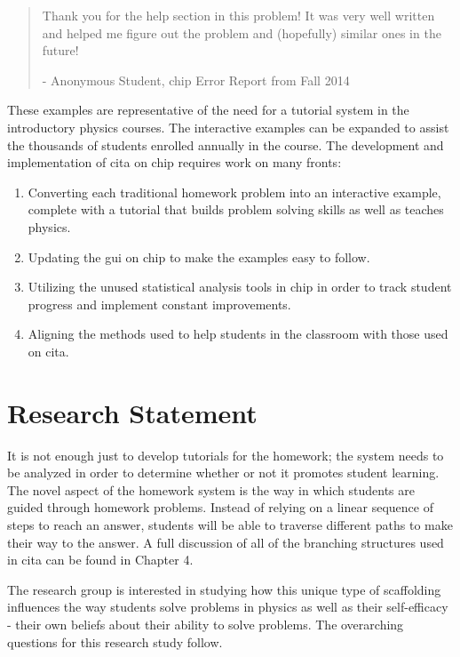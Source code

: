 \begin{quote}
Thank you for the help section in this problem! It was very well written and helped me figure out the problem and (hopefully) similar ones in the future!

- Anonymous Student, \gls{chip} Error Report from Fall 2014
\end{quote}

These examples are representative of the need for a tutorial system in the introductory physics courses. The interactive examples can be expanded to assist the thousands of students enrolled annually in the course. The development and implementation of \gls{cita} on \gls{chip} requires work on many fronts:

\begin{enumerate}
\item Converting each traditional homework problem into an interactive example, complete with a tutorial that builds problem solving skills as well as teaches physics.
\item Updating the \gls{gui} on \gls{chip} to make the examples easy to follow.
\item Utilizing the unused statistical analysis tools in \gls{chip} in order to track student progress and implement constant improvements.
\item Aligning the methods used to help students in the classroom with those used on \gls{cita}.
\end{enumerate}

\section{Research Statement}

It is not enough just to develop tutorials for the homework; the system needs to be analyzed in order to determine whether or not it promotes student learning. The novel aspect of the homework system is the way in which students are guided through homework problems. Instead of relying on a linear sequence of steps to reach an answer, students will be able to traverse different paths to make their way to the answer. A full discussion of all of the branching structures used in \gls{cita} can be found in Chapter 4.

The research group is interested in studying how this unique type of scaffolding influences the way students solve problems in physics as well as their self-efficacy - their own beliefs about their ability to solve problems. The overarching questions for this research study follow.

